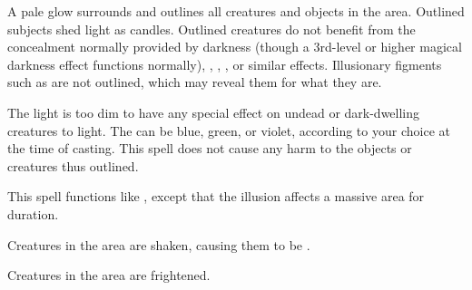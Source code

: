 \begin{comment}
\subsubsection{F}
\end{comment}

\spellrng{\rngmed}
\begin{spelleffect}
  A pale glow surrounds and outlines all creatures and objects in the area. Outlined subjects shed light as candles. Outlined creatures do not benefit from the concealment normally provided by darkness (though a 3rd-level or higher magical darkness effect functions normally), , , , or similar effects. Illusionary figments such as  are not outlined, which may reveal them for what they are.

  The light is too dim to have any special effect on undead or dark-dwelling creatures \vulnerable to light. The  can be blue, green, or violet, according to your choice at the time of casting. This spell does not cause any harm to the objects or creatures thus outlined.
\end{spelleffect}

\begin{spelleffect}
    This spell functions like , except that the illusion affects a massive area for \durlong duration.
\end{spelleffect}

\begin{spellhealthy}
  Creatures in the area are shaken, causing them to be \vulnerable.
\end{spellhealthy}
\begin{spellblood}
  Creatures in the area are frightened.
\end{spellblood}


